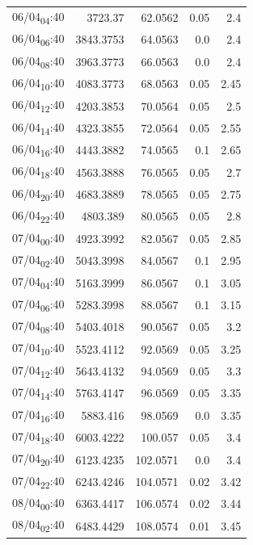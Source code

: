 \documentclass[11pt]{article}
\begin{document}
\begin{center}
\begin{tabular}{lrrrr}
06/04\textsubscript{04}:40 & 3723.37 & 62.0562 & 0.05 & 2.4\\[0pt]
06/04\textsubscript{06}:40 & 3843.3753 & 64.0563 & 0.0 & 2.4\\[0pt]
06/04\textsubscript{08}:40 & 3963.3773 & 66.0563 & 0.0 & 2.4\\[0pt]
06/04\textsubscript{10}:40 & 4083.3773 & 68.0563 & 0.05 & 2.45\\[0pt]
06/04\textsubscript{12}:40 & 4203.3853 & 70.0564 & 0.05 & 2.5\\[0pt]
06/04\textsubscript{14}:40 & 4323.3855 & 72.0564 & 0.05 & 2.55\\[0pt]
06/04\textsubscript{16}:40 & 4443.3882 & 74.0565 & 0.1 & 2.65\\[0pt]
06/04\textsubscript{18}:40 & 4563.3888 & 76.0565 & 0.05 & 2.7\\[0pt]
06/04\textsubscript{20}:40 & 4683.3889 & 78.0565 & 0.05 & 2.75\\[0pt]
06/04\textsubscript{22}:40 & 4803.389 & 80.0565 & 0.05 & 2.8\\[0pt]
07/04\textsubscript{00}:40 & 4923.3992 & 82.0567 & 0.05 & 2.85\\[0pt]
07/04\textsubscript{02}:40 & 5043.3998 & 84.0567 & 0.1 & 2.95\\[0pt]
07/04\textsubscript{04}:40 & 5163.3999 & 86.0567 & 0.1 & 3.05\\[0pt]
07/04\textsubscript{06}:40 & 5283.3998 & 88.0567 & 0.1 & 3.15\\[0pt]
07/04\textsubscript{08}:40 & 5403.4018 & 90.0567 & 0.05 & 3.2\\[0pt]
07/04\textsubscript{10}:40 & 5523.4112 & 92.0569 & 0.05 & 3.25\\[0pt]
07/04\textsubscript{12}:40 & 5643.4132 & 94.0569 & 0.05 & 3.3\\[0pt]
07/04\textsubscript{14}:40 & 5763.4147 & 96.0569 & 0.05 & 3.35\\[0pt]
07/04\textsubscript{16}:40 & 5883.416 & 98.0569 & 0.0 & 3.35\\[0pt]
07/04\textsubscript{18}:40 & 6003.4222 & 100.057 & 0.05 & 3.4\\[0pt]
07/04\textsubscript{20}:40 & 6123.4235 & 102.0571 & 0.0 & 3.4\\[0pt]
07/04\textsubscript{22}:40 & 6243.4246 & 104.0571 & 0.02 & 3.42\\[0pt]
08/04\textsubscript{00}:40 & 6363.4417 & 106.0574 & 0.02 & 3.44\\[0pt]
08/04\textsubscript{02}:40 & 6483.4429 & 108.0574 & 0.01 & 3.45\\[0pt]

\end{tabular}
\end{center}
\end{document}
